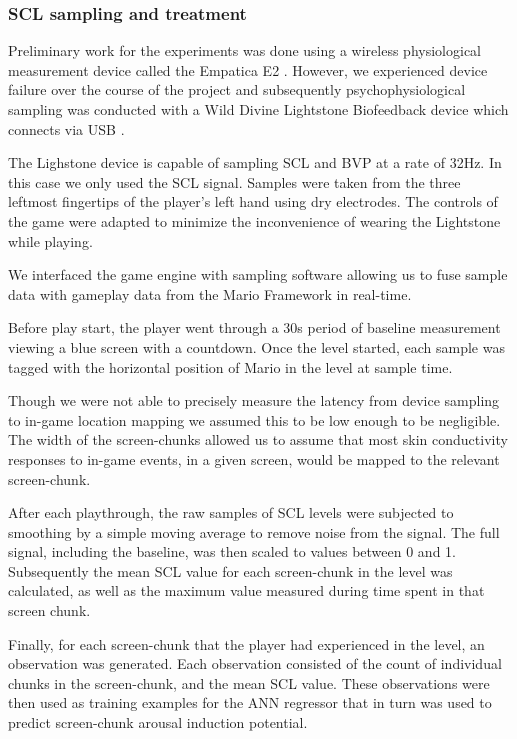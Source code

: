 \documentclass{llncs}
\begin{document}
\subsubsection{SCL sampling and treatment}
Preliminary work for the experiments was done using a wireless physiological measurement device called the Empatica E2 \cite{empatica}.
However, we experienced device failure over the course of the project and subsequently psychophysiological sampling was conducted with a Wild Divine Lightstone Biofeedback device which connects via USB \cite{wilddivine}.

The Lighstone device is capable of sampling SCL and BVP at a rate of 32Hz. In this case we only used the SCL signal.
Samples were taken from the three leftmost fingertips of the player's left hand using dry electrodes. The controls of the game were adapted to minimize the inconvenience of wearing the Lightstone while playing.

We interfaced the game engine with sampling software allowing us to fuse sample data with gameplay data from the Mario Framework in real-time.

Before play start, the player went through a 30s period of baseline measurement viewing a blue screen with a countdown.
Once the level started, each sample was tagged with the horizontal position of Mario in the level at sample time. 

Though we were not able to precisely measure the latency from device sampling to in-game location mapping we assumed this to be low enough to be negligible.
The width of the screen-chunks allowed us to assume that most skin conductivity responses to in-game events, in a given screen, would be mapped to the relevant screen-chunk.

After each playthrough, the raw samples of SCL levels were subjected to smoothing by a simple moving average to remove noise from the signal.
The full signal, including the baseline, was then scaled to values between 0 and 1. Subsequently the mean SCL value for each screen-chunk in the level was calculated, as well as the maximum value measured during time spent in that screen chunk.

Finally, for each screen-chunk that the player had experienced in the level, an observation was generated.
Each observation consisted of the count of individual chunks in the screen-chunk, and the mean SCL value.
These observations were then used as training examples for the ANN regressor that in turn was used to predict screen-chunk arousal induction potential.
\end{document}
